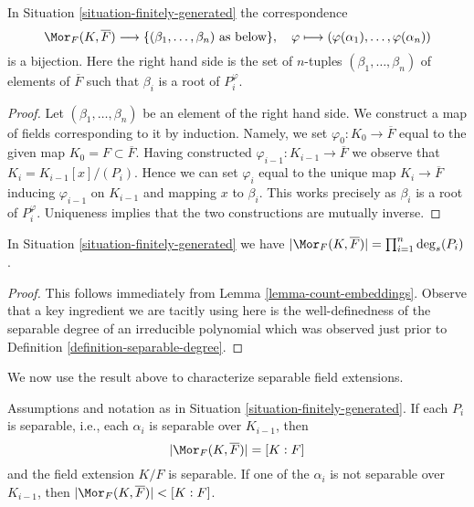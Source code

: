 \begin{lemma}
\label{lemma-count-embeddings}
In Situation \ref{situation-finitely-generated} the correspondence
$$
\Mor_F(K, \overline{F})
\longrightarrow
\{(\beta_1, \ldots, \beta_n)\text{ as below}\},
\quad
\varphi \longmapsto (\varphi(\alpha_1), \ldots, \varphi(\alpha_n))
$$
is a bijection. Here the right hand side is the set of $n$-tuples
$(\beta_1, \ldots, \beta_n)$ of elements of $\overline{F}$
such that $\beta_i$ is a root of $P_i^\varphi$.
\end{lemma}

\begin{proof}
Let $(\beta_1, \ldots, \beta_n)$ be an element of the right hand side.
We construct a map of fields corresponding to it by induction.
Namely, we set $\varphi_0 : K_0 \to \overline{F}$ equal to the given
map $K_0 = F \subset \overline{F}$. Having constructed
$\varphi_{i - 1} : K_{i - 1} \to \overline{F}$ we observe that
$K_i = K_{i - 1}[x]/(P_i)$. Hence we can set $\varphi_i$ equal
to the unique map $K_i \to \overline{F}$ inducing $\varphi_{i - 1}$
on $K_{i - 1}$ and mapping $x$ to $\beta_i$. This works precisely
as $\beta_i$ is a root of $P_i^\varphi$. Uniqueness implies that
the two constructions are mutually inverse.
\end{proof}

\begin{lemma}
\label{lemma-count-embeddings-explicitly}
In Situation \ref{situation-finitely-generated} we have
$|\Mor_F(K, \overline{F})| = \prod_{i = 1}^n \deg_s(P_i)$.
\end{lemma}

\begin{proof}
This follows immediately from Lemma \ref{lemma-count-embeddings}.
Observe that a key ingredient we are tacitly using here is the
well-definedness of the separable degree of an irreducible polynomial
which was observed just prior to
Definition \ref{definition-separable-degree}.
\end{proof}

\noindent
We now use the result above to characterize separable field extensions.

\begin{lemma}
\label{lemma-separably-generated-separable}
Assumptions and notation as in Situation \ref{situation-finitely-generated}.
If each $P_i$ is separable, i.e., each $\alpha_i$ is separable over
$K_{i - 1}$, then
$$
|\Mor_F(K, \overline{F})| = [K : F]
$$
and the field extension $K/F$ is separable. If one of the $\alpha_i$ is
not separable over $K_{i - 1}$, then
$|\Mor_F(K, \overline{F})| < [K : F]$.
\end{lemma}

